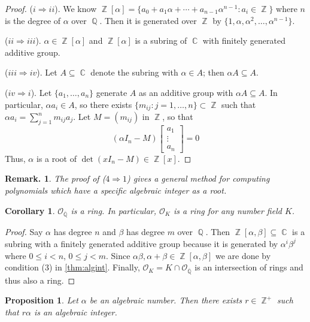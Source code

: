 \documentclass[11pt, a4paper]{memoir}
\DeclareMathOperator{\Q}{{\mathbb{Q}}}
\DeclareMathOperator{\Z}{{\mathbb{Z}}}
\DeclareMathOperator{\C}{{\mathbb{C}}}
\newcommand{\imp}[2]{($#1\Rightarrow#2$)\hspace{0.2cm}}
\theoremstyle{change}
\newtheorem{corollary}[theorem]{Corollary}
\newtheorem{proposition}[theorem]{Proposition}
\theoremstyle{plain}
\theoremstyle{nonumberplain}
\newtheorem{remark}{Remark.}
\newtheorem{proof}{Proof}
\begin{document}
\begin{proof}
    \imp{i}{ii}.
    We know $\Z[\alpha]=\{a_0+a_1\alpha+\cdots+a_{n-1}\alpha^{n-1}:a_i\in\Z\}$ where $n$ is the degree of $\alpha$ over $\Q$.
    Then it is generated over $\Z$ by $\{1,\alpha,\alpha^2,\ldots,\alpha^{n-1}\}$.

    \imp{ii}{iii}.
    $\alpha\in\Z[\alpha]$ and $\Z[\alpha]$ is a subring of $\C$ with finitely generated additive group.

    \imp{iii}{iv}.
    Let $A\subseteq\C$ denote the subring with $\alpha\in A$; then $\alpha A\subseteq A$.

    \imp{iv}{i}.
    Let $\{a_1,\ldots,a_n\}$ generate $A$ as an additive group with $\alpha A\subseteq A$.
    In particular, $\alpha a_i\in A$, so there exists $\{m_{ij}:j=1,\ldots,n\}\subset\Z$ such that $\alpha a_i=\sum_{j=1}^n m_{ij}a_j$.
    Let $M=(m_{ij})$ in $\Z$, so that
    \begin{equation*}
        (\alpha I_n-M)\begin{bmatrix}a_1\\\vdots\\a_n\end{bmatrix}=0
    \end{equation*}
    Thus, $\alpha$ is a root of $\det(xI_n-M)\in\Z[x]$.
\end{proof}
\begin{remark}
    The proof of \imp{4}{1} gives a general method for computing polynomials which have a specific algebraic integer as a root.
\end{remark}
\begin{corollary}
    $\mathcal{O}_{\overline{\Q}}$ is a ring.
    In particular, $\mathcal{O}_K$ is a ring for any number field $K$.
\end{corollary}
\begin{proof}
    Say $\alpha$ has degree $n$ and $\beta$ has degree $m$ over $\Q$.
    Then $\Z[\alpha,\beta]\subseteq\C$ is a subring with a finitely generated additive group because it is generated by $\alpha^i\beta^j$ where $0\leq i<n$, $0\leq j<m$.
    Since $\alpha\beta,\alpha+\beta\in\Z[\alpha,\beta]$ we are done by condition (3) in \cref{thm:algint}.
    Finally, $\mathcal{O}_K=K\cap\mathcal{O}_{\overline{\Q}}$ is an intersection of rings and thus also a ring.
\end{proof}
\begin{proposition}
    Let $\alpha$ be an algebraic number.
    Then there exists $r\in\Z^+$ such that $r\alpha$ is an algebraic integer.
\end{proposition}
\end{document}
